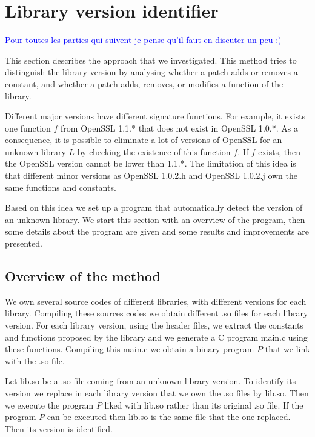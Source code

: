 \documentclass{article}
\newcommand{\ludo}[1]{\textcolor{blue}{#1}}
\begin{document}
\section{Library version identifier}
\label{section:libraryChecker}

    \ludo{Pour toutes les parties qui suivent je pense qu'il faut en discuter
    un peu :)}

    This section describes the approach that we investigated. This method
    tries to distinguish the library version by analysing whether a patch adds
    or removes a constant, and whether a patch adds, removes, or modifies a
    function of the library.
	   
    Different major versions have different signature functions. For example,
    it exists one function $f$ from OpenSSL 1.1.* that does not exist in
    OpenSSL 1.0.*. As a consequence, it is possible to eliminate a lot of
    versions of OpenSSL for an unknown library $L$ by checking the existence
    of this function $f$. If $f$ exists, then the OpenSSL version cannot be
    lower than 1.1.*. The limitation of this idea is that different minor
    versions as OpenSSL 1.0.2.h and OpenSSL 1.0.2.j own the same functions and
    constants.
   
    Based on this idea we set up a program that automatically detect the version of an
    unknown library. We start this section with an overview of the program, then
    some details about the program are given and some results and improvements are
    presented.

	\subsection{Overview of the method}
   
    We own several source codes of different libraries, with different
    versions for each library. Compiling these sources codes we obtain
    different .so files for each library version.  For each library version,
    using the header files, we extract the constants and functions proposed by
    the library and we generate a C program main.c using these functions.
    Compiling this main.c we obtain a binary program $P$ that we link with the
    .so file.


    Let lib.so be a .so file coming from an unknown library version. To
    identify its version we replace in each library version that we own the
    .so files by lib.so. Then we execute the program $P$ liked with lib.so
    rather than its original .so file.  If the program $P$ can be executed
    then lib.so is the same file that the one replaced. Then its version is
    identified.
 
\end{document}
